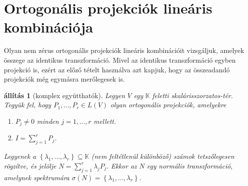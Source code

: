 \documentclass[9pt, a4paper, showtrims]{memoir}
\theoremstyle{plain}
\newtheorem{proposition}{állítás}[chapter]
\theoremstyle{remark}
\theoremstyle{definition}
\begin{document}
\section{Ortogonális projekciók lineáris kombinációja}
Olyan nem zérus ortogonális projekciók lineáris kombinációit vizsgáljuk,
amelyek összege az identikus transzformáció.
Mivel az identikus transzformáció egyben projekció is,
ezért az előző tételt használva azt kapjuk, hogy az összeadandó projekciók még egymásra merőlegesek is.
\begin{proposition}[komplex együtthatók]\label{pr:normlinkombkomplex}
	Legyen $V$ egy $\mathbb{K}$ feletti skalárisszorzatos-tér.
	Tegyük fel, hogy $P_1,\ldots,P_r\in L\left( V \right)$ olyan ortogonális projekciók,
	amelyekre
	\begin{enumerate}
		\item $P_j\neq 0$ minden $j=1,\ldots,r$ mellett.
		\item $I=\sum_{j=1}^rP_j$.
	\end{enumerate}
	Legyenek a $\left\{ \lambda_1,\ldots,\lambda_r \right\}\subseteq \mathbb{K}$
	(nem feltétlenül különböző) számok tetszőlegesen rögzítve, és
	jelölje
	\(
	N
	=
	\sum_{j=1}^r\lambda_jP_j.
	\)
	Ekkor az $N$ egy \emph{normális} transzformáció,
	amelynek spektrumára $\sigma\left( N \right)=\left\{ \lambda_1,\ldots,\lambda_r \right\}$.
\end{proposition}
\end{document}
